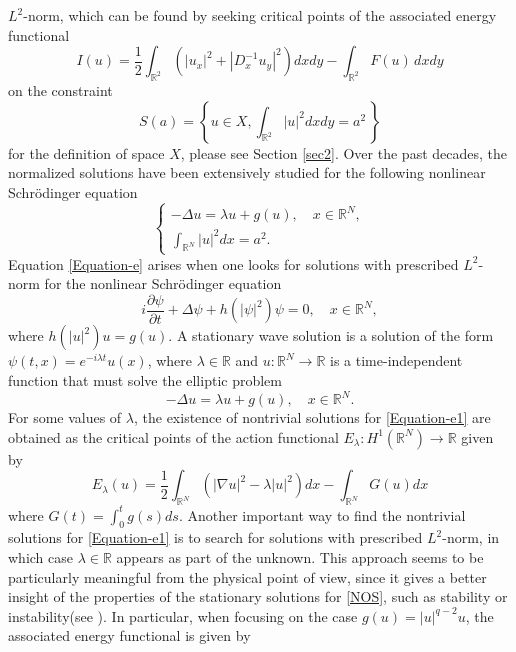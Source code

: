 \documentclass[11pt]{amsart}
\numberwithin{equation}{section}
\begin{document}
{$L^2$-norm, which can be found by seeking critical points of the associated energy functional
\begin{equation*}
    I(u)=\frac{1}{2}\int_{\mathbb{R}^{2}} \left(|u_{x}|^{2} + |D^{-1}_{x} u_{y}|^{2} \right)dx dy-\int_{\mathbb{R}^2} F(u) \,dxdy
\end{equation*}
on the constraint
$$
S(a)=\left\{u\in X, \int_{\mathbb{R}^{2}}|u|^{2}dxdy=a^{2}\, \right\}
$$
for the definition of space $X$, please see Section \ref{sec2}. Over the past decades, the normalized solutions have been extensively studied for the following nonlinear Schr\"{o}dinger equation
\begin{equation}\label{Equation-e}
    \left\{\begin{array}{l}
        -\Delta u=\lambda u+g(u), \quad x\in \mathbb{R}^N, \\[5pt]
    \displaystyle \int_{\mathbb{R}^N}|u|^2 d x=a^2.
    \end{array}\right.%
\end{equation}
Equation \eqref{Equation-e} arises when one looks for solutions with prescribed {$L^2$-norm} for the nonlinear Schr\"{o}dinger equation
\begin{equation}\label{NOS}
i \frac{\partial \psi}{\partial t}+\Delta \psi+h\left(|\psi|^2\right) \psi=0, \quad x\in \mathbb{R}^N,
\end{equation}
where $h\left(|u|^2\right) u=g(u)$.
A stationary wave solution is a solution of the form $\psi(t, x)=e^{-i \lambda t} u(x)$, where $\lambda \in \mathbb{R}$ and $u: \mathbb{R}^N \rightarrow \mathbb{R}$ is a time-independent function that must solve the elliptic problem
\begin{equation}\label{Equation-e1}
-\Delta u=\lambda u+g(u), \quad x\in \mathbb{R}^N.
\end{equation}
 For some values of $\lambda$,  the existence of nontrivial solutions for \eqref{Equation-e1} are obtained as the critical points of the action functional $E_\lambda: H^1\left(\mathbb{R}^N\right) \rightarrow \mathbb{R}$ given by
$$
E_\lambda(u)=\frac{1}{2} \int_{\mathbb{R}^N}\left(|\nabla u|^2-\lambda |u|^2\right) d x-\int_{\mathbb{R}^N} G(u) d x
$$
where $G(t)=\int_0^t g(s) d s$.
Another important way to find the nontrivial solutions for \eqref{Equation-e1} is to search for solutions with prescribed $L^2$-norm, in which case $\lambda \in \mathbb{R}$ appears as part of the unknown. This approach seems to be particularly meaningful from the physical point of view, since it gives a better insight of the properties of the stationary solutions for \eqref{NOS}, such as stability or instability(see \cite{CL}). In particular, when focusing on the case $g(u)=|u|^{q-2} u$, the associated energy functional is given by
}
\end{document}
